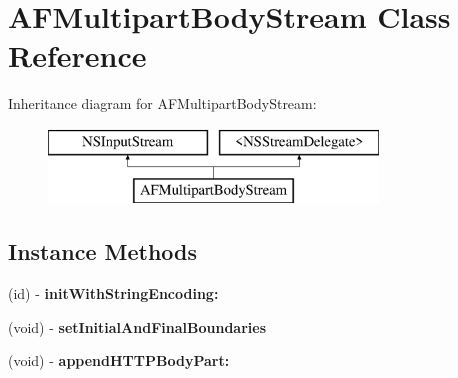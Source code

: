\hypertarget{interface_a_f_multipart_body_stream}{}\section{A\+F\+Multipart\+Body\+Stream Class Reference}
\label{interface_a_f_multipart_body_stream}
Inheritance diagram for A\+F\+Multipart\+Body\+Stream\+:\begin{figure}[H]
\begin{center}
\leavevmode
\includegraphics[height=2.000000cm]{interface_a_f_multipart_body_stream}
\end{center}
\end{figure}
\subsection*{Instance Methods}
\begin{DoxyCompactItemize}
\item 
\hypertarget{interface_a_f_multipart_body_stream_ad574aa0595950246138a1eba40083bd6}{}(id) -\/ {\bfseries init\+With\+String\+Encoding\+:}\label{interface_a_f_multipart_body_stream_ad574aa0595950246138a1eba40083bd6}

\item 
\hypertarget{interface_a_f_multipart_body_stream_acb7e1157e8d26b767eb6eff0f950d21f}{}(void) -\/ {\bfseries set\+Initial\+And\+Final\+Boundaries}\label{interface_a_f_multipart_body_stream_acb7e1157e8d26b767eb6eff0f950d21f}

\item 
\hypertarget{interface_a_f_multipart_body_stream_aa51ac96df564e3876544e75af738d64f}{}(void) -\/ {\bfseries append\+H\+T\+T\+P\+Body\+Part\+:}\label{interface_a_f_multipart_body_stream_aa51ac96df564e3876544e75af738d64f}

\end{DoxyCompactItemize}
